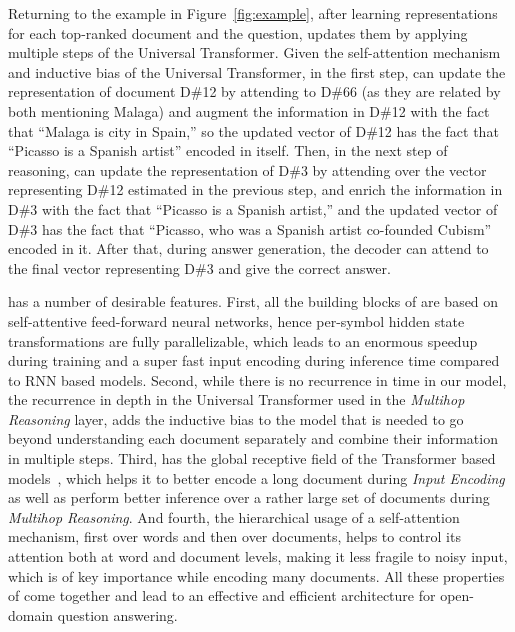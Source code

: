Returning to the example in Figure~\ref{fig:example}, after learning representations for each top-ranked document and the question, \tracrnet updates them by applying multiple steps of the Universal Transformer. 
Given the self-attention mechanism and inductive bias of the Universal Transformer, in the first step, \tracrnet can update the representation of document D\#12 by attending to D\#66 (as they are related by both mentioning Malaga) and augment the information in D\#12 with the fact that ``Malaga is city in Spain,'' so the updated vector of D\#12 has the fact that ``Picasso is a Spanish artist'' encoded in itself. 
Then, in the next step of reasoning, \tracrnet can update the representation of D\#3 by attending over the vector representing D\#12 estimated in the previous step, and enrich the information in D\#3 with the fact that ``Picasso is a Spanish artist,'' and the updated vector of D\#3 has the fact that ``Picasso, who was a Spanish artist co-founded Cubism'' encoded in it. 
After that, during answer generation, the decoder can attend to the final vector representing D\#3 and give the correct answer.

\tracrnet has a number of desirable features.
%
First, all the building blocks of \tracrnet are based on self-attentive feed-forward neural networks, hence per-symbol hidden state transformations are fully parallelizable, which leads to an enormous speedup during training and a super fast input encoding during inference time compared to RNN based models. 
Second, while there is no recurrence in time in our model, the recurrence in depth in the Universal Transformer used in the \emph{Multihop Reasoning} layer, adds the inductive bias to the model that is needed to go beyond understanding each document separately and combine their information in multiple steps.
Third, \tracrnet has the global receptive field of the Transformer based models~\citep{vaswani2017attention,Dehghani:ICLR:2019}, which helps it to better encode a long document during \emph{Input Encoding} as well as perform better inference over a rather large set of documents during \emph{Multihop Reasoning}.
And fourth, the hierarchical usage of a self-attention mechanism, first over words and then over documents, helps \tracrnet to control its attention both at word and document levels, making it less fragile to noisy input, which is of key importance while encoding many documents.
%
All these properties of \tracrnet come together and lead to an effective and efficient architecture for open-domain question answering. 

